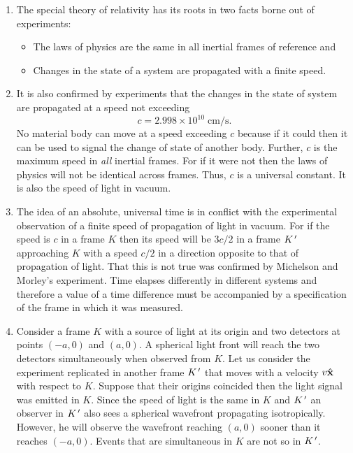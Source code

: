 \begin{enumerate}
\item The special theory of relativity has its roots in two facts borne out 
of experiments:
\begin{itemize}
\item The laws of physics are the same in all inertial frames of reference and
\item Changes in the state of a system are propagated with a finite speed.
\end{itemize}

\item It is also confirmed by experiments that the changes in the state of system 
are propagated at a speed not exceeding
\begin{equation}\label{c1e1}
c = 2.998 \times 10^{10} \;\text{cm/s}.
\end{equation}
No material body can move at a speed exceeding $c$ because if it could then it
can be used to signal the change of state of another body. Further, $c$ is the
maximum speed in \emph{all} inertial frames. For if it were not then the laws of
physics will not be identical across frames. Thus, $c$ is a universal constant.
It is also the speed of light in vacuum.

\item The idea of an absolute, universal time is in conflict with the experimental 
observation of a finite speed of propagation of light in vacuum. For if the
speed is $c$ in a frame $K$ then its speed will be $3c/2$ in a frame $K^{\,\prime}$
approaching $K$ with a speed $c/2$ in a direction opposite to that of propagation
of light. That this is not true was confirmed by Michelson and Morley's experiment.
Time elapses differently in different systems and therefore a value of a time
difference must be accompanied by a specification of the frame in which it was 
measured.

\item Consider a frame $K$ with a source of light at its origin and two detectors at
points $(-a, 0)$ and $(a, 0)$. A spherical light front will reach the two 
detectors simultaneously when observed from $K$. Let us consider the experiment
replicated in another frame $K^{\,\prime}$ that moves with a velocity $v\hat{\mathbf{x}}$ with
respect to $K$. Suppose that their origins coincided then the light signal was 
emitted in $K$. Since the speed of light is the same in $K$ and $K^{\,\prime}$ an observer
in $K^{\,\prime}$ also sees a spherical wavefront propagating isotropically. However, he
will observe the wavefront reaching $(a, 0)$ sooner than it reaches $(-a, 0)$.
Events that are simultaneous in $K$ are not so in $K^{\,\prime}$.


\end{enumerate}
